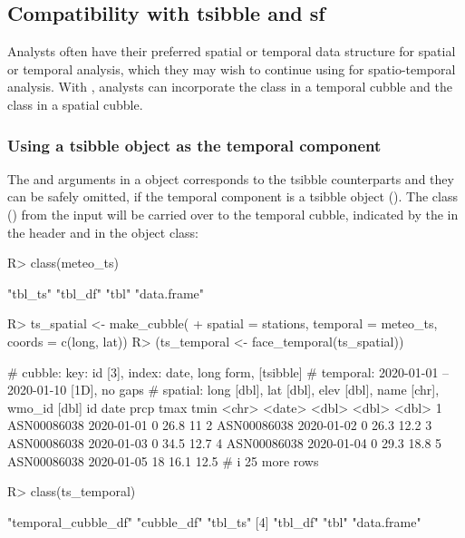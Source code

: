 \documentclass[
  shortnames]{jss}
\begin{document}
\hypertarget{compatibility-with-tsibble-and-sf}{%
\subsection{Compatibility with tsibble and sf}\label{compatibility-with-tsibble-and-sf}}

Analysts often have their preferred spatial or temporal data structure for spatial or temporal analysis, which they may wish to continue using for spatio-temporal analysis. With , analysts can incorporate the  class in a temporal cubble and the  class in a spatial cubble.

\hypertarget{using-a-tsibble-object-as-the-temporal-component}{%
\subsubsection{Using a tsibble object as the temporal component}\label{using-a-tsibble-object-as-the-temporal-component}}

The  and  arguments in a  object corresponds to the tsibble counterparts and they can be safely omitted, if the temporal component is a tsibble object (). The  class () from the input will be carried over to the temporal cubble, indicated by the \code{[tsibble]} in the header and in the object class:

\begin{CodeChunk}
\begin{CodeInput}
R> class(meteo_ts)
\end{CodeInput}
\begin{CodeOutput}
[1] "tbl_ts"     "tbl_df"     "tbl"        "data.frame"
\end{CodeOutput}
\begin{CodeInput}
R> ts_spatial <- make_cubble(
+   spatial = stations, temporal = meteo_ts, coords = c(long, lat))
R> (ts_temporal <- face_temporal(ts_spatial))
\end{CodeInput}
\begin{CodeOutput}
# cubble:   key: id [3], index: date, long form, [tsibble]
# temporal: 2020-01-01 -- 2020-01-10 [1D], no gaps
# spatial:  long [dbl], lat [dbl], elev [dbl], name [chr], wmo_id [dbl]
  id          date        prcp  tmax  tmin
  <chr>       <date>     <dbl> <dbl> <dbl>
1 ASN00086038 2020-01-01     0  26.8  11  
2 ASN00086038 2020-01-02     0  26.3  12.2
3 ASN00086038 2020-01-03     0  34.5  12.7
4 ASN00086038 2020-01-04     0  29.3  18.8
5 ASN00086038 2020-01-05    18  16.1  12.5
# i 25 more rows
\end{CodeOutput}
\begin{CodeInput}
R> class(ts_temporal)
\end{CodeInput}
\begin{CodeOutput}
[1] "temporal_cubble_df" "cubble_df"          "tbl_ts"            
[4] "tbl_df"             "tbl"                "data.frame"        
\end{CodeOutput}
\end{CodeChunk}
\end{document}
